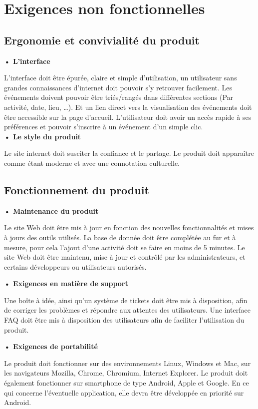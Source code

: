 \documentclass[a4paper,12pt]{article}
\begin{document}
\section{Exigences non fonctionnelles}

\subsection{Ergonomie et convivialité du produit}

\textbf{• L’interface}

L’interface doit être épurée, claire et simple d’utilisation, un utilisateur sans grandes connaissances d’internet doit pouvoir s’y retrouver facilement. Les événements doivent pouvoir être triés/rangés dans différentes sections (Par activité, date, lieu, …). Et un lien direct vers la visualisation des événements doit être accessible sur la page d’accueil.
L’utilisateur doit avoir un accès rapide à ses préférences et pouvoir s’inscrire à un événement d’un simple clic. \\

\textbf{• Le style du produit}

Le site internet doit susciter la confiance et le partage. Le produit doit apparaître comme étant moderne et avec une connotation culturelle.

\subsection{Fonctionnement du produit}

\textbf{• Maintenance du produit}

Le site Web doit être mis à jour en fonction des nouvelles fonctionnalités et mises à jours des outils utilisés.
La base de donnée doit être complétée au fur et à mesure, pour cela l’ajout d’une activité doit se faire en moins de 5 minutes.
Le site Web doit être maintenu, mise à jour et contrôlé par les administrateurs, et certains développeurs ou utilisateurs autorisés.

\textbf{• Exigences en matière de support}

Une boîte à idée, ainsi qu’un système de tickets doit être mis à disposition, afin de corriger les problèmes et répondre aux attentes des utilisateurs.
Une interface FAQ doit être mis à disposition des utilisateurs afin de faciliter l’utilisation du produit.

\textbf{• Exigences de portabilité}

Le produit doit fonctionner sur des environnements Linux, Windows et Mac, sur les navigateurs Mozilla, Chrome, Chromium, Internet Explorer. Le produit doit également fonctionner sur smartphone de type Android, Apple et Google. En ce qui concerne l’éventuelle application, elle devra être développée en priorité sur Android.
\end{document}
